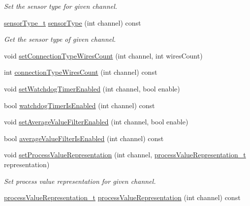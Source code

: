 \begin{DoxyCompactItemize}
\begin{DoxyCompactList}\small\item\em Set the sensor type for given channel. \end{DoxyCompactList}\item 
\hyperlink{classmdt_device_modbus_wago_module_rtd_a3ef847ef5be945559be1271e15905fb0}{sensor\-Type\-\_\-t} \hyperlink{classmdt_device_modbus_wago_module_rtd_aaee7df330e87d5facbbc6f73e3f356ce}{sensor\-Type} (int channel) const 
\begin{DoxyCompactList}\small\item\em Get the sensor type of given channel. \end{DoxyCompactList}\item 
void \hyperlink{classmdt_device_modbus_wago_module_rtd_a95c5db06b1245b8f3526fda60c307a89}{set\-Connection\-Type\-Wires\-Count} (int channel, int wires\-Count)
\item 
int \hyperlink{classmdt_device_modbus_wago_module_rtd_af16255b0e876f971dfe3ea0139f040e1}{connection\-Type\-Wires\-Count} (int channel) const 
\item 
void \hyperlink{classmdt_device_modbus_wago_module_rtd_a1b55d99a6ddf7ce95d18aeb081aafd73}{set\-Watchdog\-Timer\-Enabled} (int channel, bool enable)
\item 
bool \hyperlink{classmdt_device_modbus_wago_module_rtd_a708c35425e024374e840c5ccc0b77d8b}{watchdog\-Timer\-Is\-Enabled} (int channel) const 
\item 
void \hyperlink{classmdt_device_modbus_wago_module_rtd_a49080955e90c46ab5d05b2a427d67721}{set\-Average\-Value\-Filter\-Enabled} (int channel, bool enable)
\item 
bool \hyperlink{classmdt_device_modbus_wago_module_rtd_a2ea9a2eeb55e1ef943d951bffc49f163}{average\-Value\-Filter\-Is\-Enabled} (int channel) const 
\item 
void \hyperlink{classmdt_device_modbus_wago_module_rtd_a012c6438f55b5653c7320dbe477d93b5}{set\-Process\-Value\-Representation} (int channel, \hyperlink{classmdt_device_modbus_wago_module_rtd_a6edcc72b85641ca88d66ca45a7650ca8}{process\-Value\-Representation\-\_\-t} representation)
\begin{DoxyCompactList}\small\item\em Set process value representation for given channel. \end{DoxyCompactList}\item 
\hyperlink{classmdt_device_modbus_wago_module_rtd_a6edcc72b85641ca88d66ca45a7650ca8}{process\-Value\-Representation\-\_\-t} \hyperlink{classmdt_device_modbus_wago_module_rtd_af84714e285705c3ef3415648892beae7}{process\-Value\-Representation} (int channel) const 

\end{DoxyCompactItemize}

